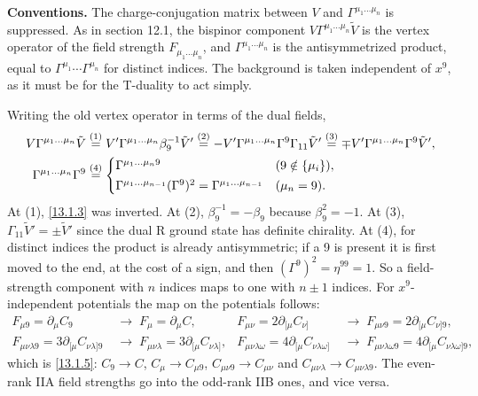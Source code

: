 \begin{tcolorbox}[breakable]
	\begin{remark}
		\textbf{Conventions.} The charge-conjugation matrix between $V$ and $\Gamma^{\mu_1\dots\mu_n}$ is suppressed. As in section 12.1, the bispinor component $V\Gamma^{\mu_1\dots\mu_n}\tilde V$ is the vertex operator of the field strength $F_{\mu_1\dots\mu_n}$, and $\Gamma^{\mu_1\dots\mu_n}$ is the antisymmetrized product, equal to $\Gamma^{\mu_1}\cdots\Gamma^{\mu_n}$ for distinct indices. The background is taken independent of $x^9$, as it must be for the T-duality to act simply.

		Writing the old vertex operator in terms of the dual fields,
		\begin{align*}
			V\Gamma^{\mu_1\dots\mu_n}\tilde V
			&\overset{(1)}{=} V'\Gamma^{\mu_1\dots\mu_n}\beta_9^{-1}\tilde V'
			\overset{(2)}{=} -V'\Gamma^{\mu_1\dots\mu_n}\Gamma^9\Gamma_{11}\tilde V'
			\overset{(3)}{=} \mp V'\Gamma^{\mu_1\dots\mu_n}\Gamma^9\tilde V' ,\\
			\Gamma^{\mu_1\dots\mu_n}\Gamma^9 &\overset{(4)}{=}
			\begin{cases}
				\Gamma^{\mu_1\dots\mu_n 9} & (9\notin\{\mu_i\}),\\[2pt]
				\Gamma^{\mu_1\dots\mu_{n-1}}(\Gamma^9)^2=\Gamma^{\mu_1\dots\mu_{n-1}} & (\mu_n=9).
			\end{cases}
		\end{align*}
		At (1), \eqref{13.1.3} was inverted. At (2), $\beta_9^{-1}=-\beta_9$ because $\beta_9^2=-1$. At (3), $\Gamma_{11}\tilde V'=\pm\tilde V'$ since the dual R ground state has definite chirality. At (4), for distinct indices the product is already antisymmetric; if a 9 is present it is first moved to the end, at the cost of a sign, and then $(\Gamma^9)^2=\eta^{99}=1$. So a field-strength component with $n$ indices maps to one with $n\pm1$ indices. For $x^9$-independent potentials the map on the potentials follows:
		\begin{align*}
			F_{\mu9}=\partial_\mu C_9 &\;\to\; F_\mu=\partial_\mu C, &
			F_{\mu\nu}=2\partial_{[\mu}C_{\nu]} &\;\to\; F_{\mu\nu9}=2\partial_{[\mu}C_{\nu]9},\\
			F_{\mu\nu\lambda9}=3\partial_{[\mu}C_{\nu\lambda]9} &\;\to\; F_{\mu\nu\lambda}=3\partial_{[\mu}C_{\nu\lambda]}, &
			F_{\mu\nu\lambda\omega}=4\partial_{[\mu}C_{\nu\lambda\omega]} &\;\to\; F_{\mu\nu\lambda\omega9}=4\partial_{[\mu}C_{\nu\lambda\omega]9},
		\end{align*}
		which is \eqref{13.1.5}: $C_9\to C$, $C_\mu\to C_{\mu9}$, $C_{\mu\nu9}\to C_{\mu\nu}$ and $C_{\mu\nu\lambda}\to C_{\mu\nu\lambda9}$. The even-rank IIA field strengths go into the odd-rank IIB ones, and vice versa.
	\end{remark}
\end{tcolorbox}

